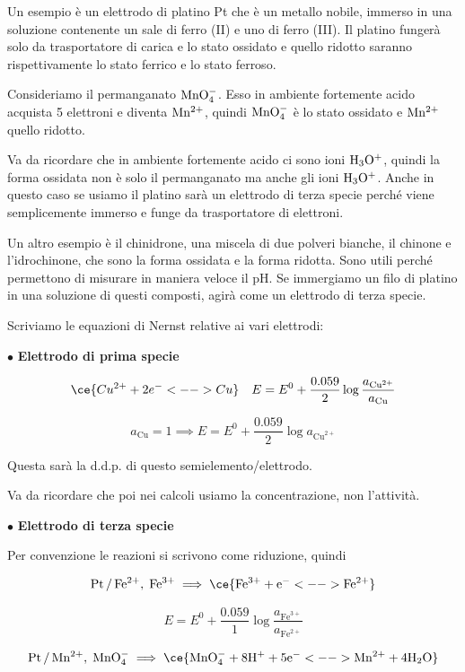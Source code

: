 Un esempio è un elettrodo di platino Pt che è un metallo nobile, immerso in una soluzione contenente un sale di ferro (II) e uno di ferro (III). Il platino fungerà solo da trasportatore di carica e lo stato ossidato e quello ridotto saranno rispettivamente lo stato ferrico e lo stato ferroso.

Consideriamo il permanganato $\rm MnO_4^-$. Esso in ambiente fortemente acido acquista 5 elettroni e diventa $\rm Mn^{2+}$, quindi $\rm MnO_4^-$ è lo stato ossidato e $\rm Mn^{2+}$ quello ridotto.

Va da ricordare che in ambiente fortemente acido ci sono ioni $\rm H_3O^+$, quindi la forma ossidata non è solo il permanganato ma anche gli ioni $\rm H_3O^+$. Anche in questo caso se usiamo il platino sarà un elettrodo di terza specie perché viene semplicemente immerso e funge da trasportatore di elettroni.

Un altro esempio è il chinidrone, una miscela di due polveri bianche, il chinone e l'idrochinone, che sono la forma ossidata e la forma ridotta. Sono utili perché permettono di misurare in maniera veloce il pH. Se immergiamo un filo di platino in una soluzione di questi composti, agirà come un elettrodo di terza specie.

\vspace{0.2cm}Scriviamo le equazioni di Nernst relative ai vari elettrodi:

\vspace{0.2cm} $\bullet$ \textbf{Elettrodo di prima specie}

$$\ce{Cu^{2+} + 2e^- <--> Cu} \quad E= E^0 + \frac{0.059}{2}\log \frac{a_{\text{Cu}^{2+}}}{a_{\text{Cu}}}$$

$$a_{\text{Cu}}=1 \implies E= E^0 + \frac{0.059}{2}\log a_{\text{Cu}^{2+}}$$

Questa sarà la d.d.p. di questo semielemento/elettrodo.

Va da ricordare che poi nei calcoli usiamo la concentrazione, non l'attività.

\vspace{0.2cm} $\bullet$ \textbf{Elettrodo di terza specie}

Per convenzione le reazioni si scrivono come riduzione, quindi

$$\rm Pt\,/\,Fe^{2+}, \; Fe^{3+} \implies \ce{Fe^{3+} + e^- <--> Fe^{2+}} $$

$$E = E^0 + \frac{0.059}{1} \log \frac{a_{\text{Fe}^{3+}}}{a_{\text{Fe}^{2+}}}$$

$$\rm Pt\,/\,Mn^{2+}, \; MnO_4^- \implies \ce{MnO_4^- + 8H^+ + 5e^- <--> Mn^{2+} + 4H_2O} $$

